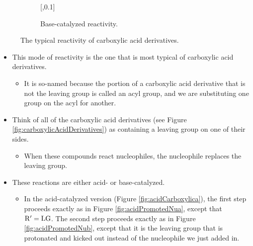 \documentclass[../notes.tex]{subfiles}
\begin{document}
\begin{itemize}
\begin{figure}[H]
\begin{subfigure}[b]{\linewidth}
                [,0.1]\+
                \arrow{->[][-\ce{B}]}
            \schemestop
            \caption{Base-catalyzed reactivity.}
            \label{fig:acidCarboxylicb}
        \end{subfigure}
        \caption{The typical reactivity of carboxylic acid derivatives.}
        \label{fig:acidCarboxylic}
    \end{figure}
    \begin{itemize}
        \item This mode of reactivity is the one that is most typical of carboxylic acid derivatives.
        \begin{itemize}
            \item It is so-named because the portion of a carboxylic acid derivative that is not the leaving group is called an acyl group, and we are substituting one group on the acyl for another.
        \end{itemize}
        \item Think of all of the carboxylic acid derivatives (see Figure \ref{fig:carboxylicAcidDerivatives}) as containing a leaving group on one of their sides.
        \begin{itemize}
            \item When these compounds react nucleophiles, the nucleophile replaces the leaving group.
        \end{itemize}
        \item These reactions are either acid- or base-catalyzed.
        \begin{itemize}
            \item In the acid-catalyzed version (Figure \ref{fig:acidCarboxylica}), the first step proceeds exactly as in Figure \ref{fig:acidPromotedNua}, except that $\ce{R$'$}=\ce{LG}$. The second step proceeds exactly as in Figure \ref{fig:acidPromotedNub}, except that it is the leaving group that is protonated and kicked out instead of the nucleophile we just added in.

\end{itemize}
\end{itemize}
\end{itemize}
\end{document}
